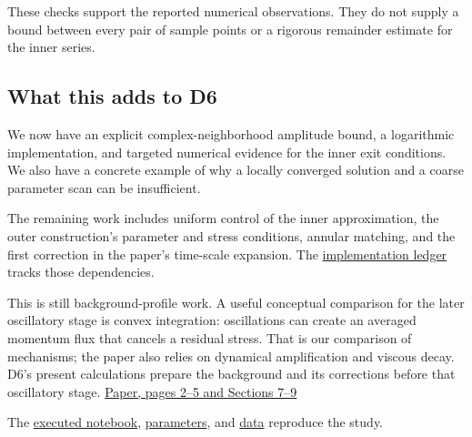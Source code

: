 \documentclass[
  english,
  11pt,
]{article}
\begin{document}
These checks support the reported numerical observations. They do not
supply a bound between every pair of sample points or a rigorous
remainder estimate for the inner series.

\subsection{What this adds to D6}\label{what-this-adds-to-d6}

We now have an explicit complex-neighborhood amplitude bound, a
logarithmic implementation, and targeted numerical evidence for the
inner exit conditions. We also have a concrete example of why a locally
converged solution and a coarse parameter scan can be insufficient.

The remaining work includes uniform control of the inner approximation,
the outer construction's parameter and stress conditions, annular
matching, and the first correction in the paper's time-scale expansion.
The
\href{../d6_moment_correction/implementation-ledger.md}{implementation
ledger} tracks those dependencies.

This is still background-profile work. A useful conceptual comparison
for the later oscillatory stage is convex integration: oscillations can
create an averaged momentum flux that cancels a residual stress. That is
our comparison of mechanisms; the paper also relies on dynamical
amplification and viscous decay. D6's present calculations prepare the
background and its corrections before that oscillatory stage.
\href{https://cdn.openai.com/pdf/32d9f210-8b73-45e0-91bc-82a30aef8a9a/navier-stokes.pdf}{Paper,
pages 2--5 and Sections 7--9}

The \href{../../code/d6_global_axis/study.ipynb}{executed notebook},
\href{../../code/d6_global_axis/parameters.json}{parameters}, and
\href{../../code/d6_global_axis/data/}{data} reproduce the study.
\end{document}
